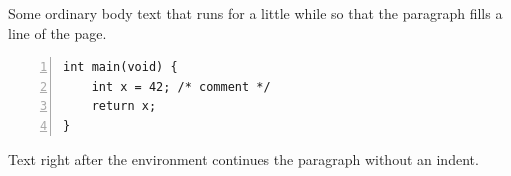 \documentclass{article}
\begin{document}
Some ordinary body text that runs for a little while so that the paragraph fills a line of the page.
\begin{lstlisting}[basicstyle=\ttfamily\small,frame=lines,numbers=left]
int main(void) {
    int x = 42; /* comment */
    return x;
}
\end{lstlisting}
Text right after the environment continues the paragraph without an indent.
\end{document}
